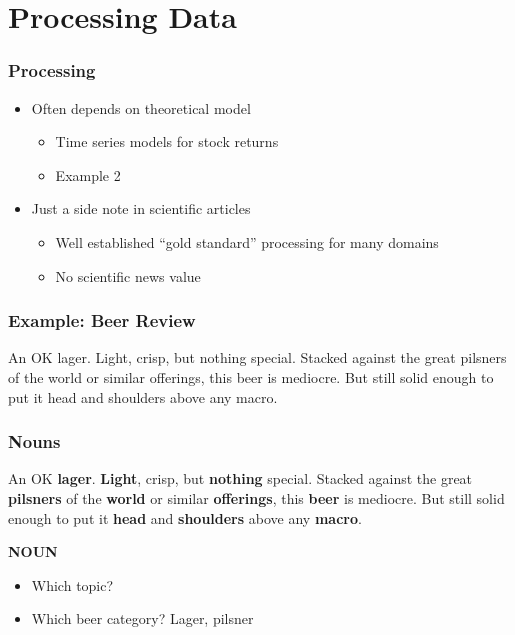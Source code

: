 
 \section{Processing Data}
\begin{frame}
    \frametitle{Processing}
    \begin{itemize}
        \item Often depends on theoretical model
        \begin{itemize}
            \item Time series models for stock returns
            \item Example 2
        \end{itemize}
        \item Just a side note in scientific articles
        \begin{itemize}
            \item Well established ``gold standard'' processing for many domains
            \item No scientific news value
        \end{itemize}
    \end{itemize}
\end{frame}


\begin{frame}
    \frametitle{Example: Beer Review}
\begin{spacing}{1.6}
    An OK lager. Light, crisp, but nothing special. Stacked against the great pilsners of the world or similar offerings, this beer is mediocre. But still solid enough to put it head and shoulders above any macro. 
\end{spacing}

\end{frame}


\begin{frame}
    \frametitle{Nouns}
\begin{spacing}{1.6}
    An OK \textbf{\textcolor{isered}{lager}}. \textbf{\textcolor{isered}{Light}}, crisp, but \textbf{\textcolor{isered}{nothing}} special. Stacked against the great \textbf{\textcolor{isered}{pilsners}} of the \textbf{\textcolor{isered}{world}} or similar \textbf{\textcolor{isered}{offerings}}, this \textbf{\textcolor{isered}{beer}} is mediocre. But still solid enough to put it \textbf{\textcolor{isered}{head}} and \textbf{\textcolor{isered}{shoulders}} above any \textbf{\textcolor{isered}{macro}}.
\end{spacing}

\vspace{-10pt}
\begin{flushright}
    \textbf{\textcolor{isered}{NOUN}}
\end{flushright}

\vspace{-10pt}
\begin{itemize}
\item Which topic?
\item Which beer category? Lager, pilsner
\end{itemize}
\end{frame}


